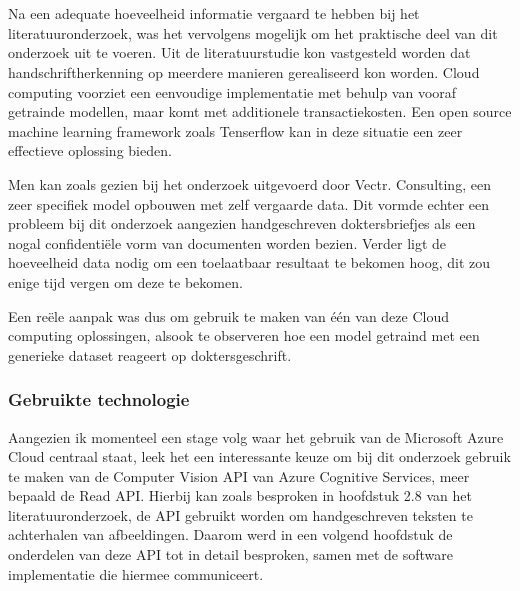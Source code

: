 
\chapter{}
\label{ch:methodologie}


Na een adequate hoeveelheid informatie vergaard te hebben bij het literatuuronderzoek, was het vervolgens mogelijk om het praktische deel van dit onderzoek uit te voeren. Uit de literatuurstudie kon vastgesteld worden dat handschriftherkenning op meerdere manieren gerealiseerd kon worden. Cloud computing voorziet een eenvoudige implementatie met behulp van vooraf getrainde modellen, maar komt met additionele transactiekosten. Een open source machine learning framework zoals Tenserflow kan in deze situatie een zeer effectieve oplossing bieden. 


Men kan zoals gezien bij het onderzoek uitgevoerd door Vectr. Consulting, een zeer specifiek model opbouwen met zelf vergaarde data. Dit vormde echter een probleem bij dit onderzoek aangezien handgeschreven doktersbriefjes als een nogal confidentiële vorm van documenten worden bezien. Verder ligt de hoeveelheid data nodig om een toelaatbaar resultaat te bekomen hoog, dit zou enige tijd vergen om deze te bekomen. 


Een reële aanpak was dus om gebruik te maken van één van deze Cloud computing oplossingen, alsook te observeren hoe een model getraind met een generieke dataset reageert op doktersgeschrift.

\newpage
\subsection{Gebruikte technologie}
Aangezien ik momenteel een stage volg waar het gebruik van de Microsoft Azure Cloud centraal staat, leek het een interessante keuze om bij dit onderzoek gebruik te maken van de Computer Vision API van Azure Cognitive Services, meer bepaald de Read API. Hierbij kan zoals besproken in hoofdstuk 2.8 van het literatuuronderzoek, de API gebruikt worden om handgeschreven teksten te achterhalen van afbeeldingen. Daarom werd in een volgend hoofdstuk de onderdelen van deze API tot in detail besproken, samen met de software implementatie die hiermee communiceert.
